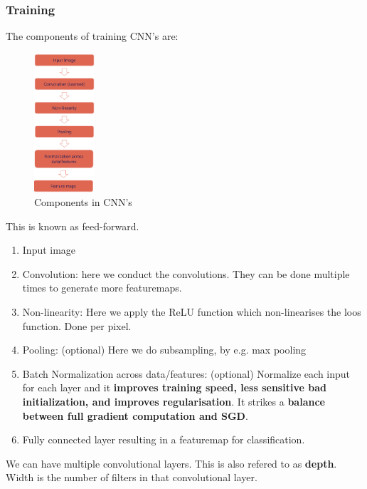 \documentclass[a4paper]{article}
\begin{document}
\subsubsection*{Training}

The components of training CNN's are:

\begin{figure}[H]
\centering
\includegraphics[width=0.2\textwidth]{figures/CNN-pipeline.png}
\caption{Components in CNN's}
\label{fig:CNN_walktrough}
\end{figure} 

This is known as feed-forward. 
\begin{enumerate}
	\item Input image
	\item Convolution: here we conduct the convolutions. They can be done multiple times to generate more featuremaps.
	\item Non-linearity: Here we apply the ReLU function which non-linearises the loos function. Done per pixel.
	\item Pooling: (optional) Here we do subsampling, by e.g. max pooling 
	\item Batch Normalization across data/features: (optional) Normalize each input for each layer and it \textbf{improves training speed, less sensitive bad initialization, and improves regularisation}. It strikes a \textbf{balance between full gradient computation and SGD}.  
	\item Fully connected layer resulting in a featuremap for classification. 
\end{enumerate}

We can have multiple convolutional layers. This is also refered to as \textbf{depth}. Width is the number of filters in that convolutional layer. 
\end{document}
